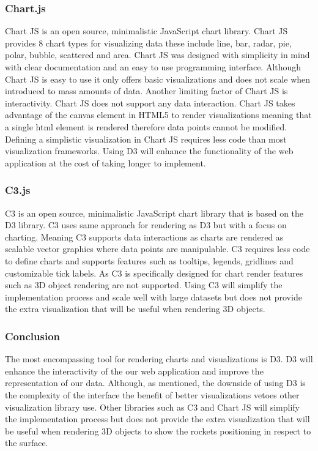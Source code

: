 \documentclass[onecolumn, draftclsnofoot,10pt, compsoc]{IEEEtran}
\begin{document}
\subsubsection{Chart.js}
Chart JS is an open source, minimalistic JavaScript chart library. Chart JS provides 8 chart types for visualizing data these include line, bar, radar, pie, polar, bubble, scattered and area. Chart JS was designed with simplicity in mind with clear documentation and an easy to use programming interface. Although Chart JS is easy to use it only offers basic visualizations and does not scale when introduced to mass amounts of data. Another limiting factor of Chart JS is interactivity. Chart JS does not support any data interaction. Chart JS takes advantage of the canvas element in HTML5 to render visualizations meaning that a single html element is rendered therefore data points cannot be modified. Defining a simplistic visualization in Chart JS requires less code than most visualization frameworks. Using D3 will enhance the functionality of the web application at the cost of taking longer to implement. 
\subsubsection{C3.js}
C3 is an open source, minimalistic JavaScript chart library that is based on the D3 library. C3 uses same approach for rendering as D3 but with a focus on charting. Meaning C3 supports data interactions as charts are rendered as scalable vector graphics where data points are manipulable. C3 requires less code to define charts and supports features such as tooltips, legends, gridlines and customizable tick labels. As C3 is specifically designed for chart render features such as 3D object rendering are not supported. Using C3 will simplify the implementation process and scale well with large datasets but does not provide the extra visualization that will be useful when rendering 3D objects. 
\subsubsection{Conclusion}
The most encompassing tool for rendering charts and visualizations is D3. D3 will enhance the interactivity of the our web application and improve the representation of our data. Although, as mentioned, the downside of using D3 is the complexity of the interface the benefit of better visualizations vetoes other visualization library use. Other libraries such as C3 and Chart JS will simplify the implementation process but does not provide the extra visualization that will be useful when rendering 3D objects to show the rockets positioning in respect to the surface. 
\end{document}
